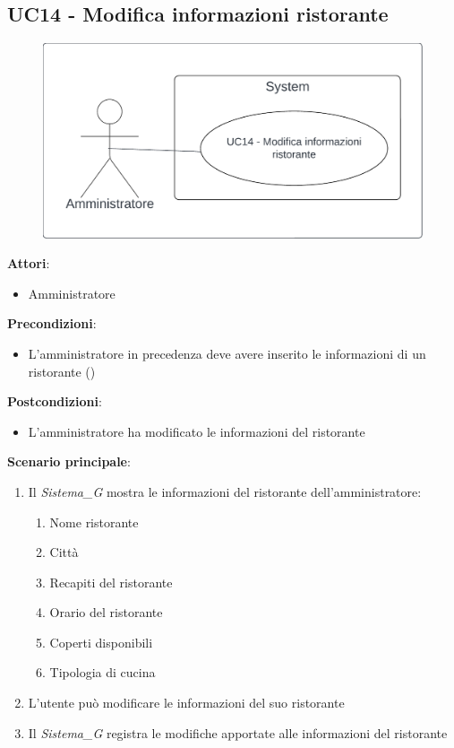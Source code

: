 \subsection{UC14 - Modifica informazioni ristorante} \label{usecase:14}
\begin{figure}[H]
    \centering
    \includegraphics[width=0.9\linewidth]{ucd/ucd14.png}
\end{figure}
\textbf{Attori}:
\begin{itemize}
    \item Amministratore
\end{itemize}
\textbf{Precondizioni}:
\begin{itemize}
    \item L'amministratore in precedenza deve avere inserito le informazioni di un ristorante ()
\end{itemize}
\textbf{Postcondizioni}:
\begin{itemize}
    \item L'amministratore ha modificato le informazioni del ristorante
\end{itemize}
\textbf{Scenario principale}:
\begin{enumerate}
    \item Il \textit{Sistema_G} mostra le informazioni del ristorante dell'amministratore:
    \begin{enumerate}
        \item Nome ristorante
        \item Città
        \item Recapiti del ristorante
        \item Orario del ristorante
        \item Coperti disponibili
        \item Tipologia di cucina
    \end{enumerate}
    \item L'utente può modificare le informazioni del suo ristorante
    \item Il \textit{Sistema_G} registra le modifiche apportate alle informazioni del ristorante
\end{enumerate}
\newpage